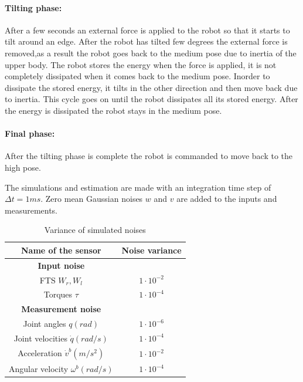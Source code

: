 \paragraph{Tilting phase:} After a few seconds an external force is applied to the robot so that it starts to tilt around an edge. After the robot has tilted few degrees the external force is removed,as a result the robot goes back to the medium pose due to inertia of the upper body. The robot stores the energy when the force is applied, it is not completely dissipated when it comes back to the medium pose. Inorder to dissipate the stored energy, it tilts in the other direction and then move back due to inertia. This cycle goes on until the robot dissipates all its stored energy. After the energy is dissipated the robot stays in the medium pose.
\paragraph{Final phase:} After the tilting phase is complete the robot is commanded to move back to the high pose.

The simulations and estimation are made with an integration time step of $\Delta t=1ms$. Zero mean Gaussian noises $w$ and $v$ are added to the inputs and measurements.
\begin{table}[H]
    \centering
    \begin{tabular}{|c|c|}
    \hline
    Name of the sensor &Noise variance \\ \hline
    \textbf{Input noise} &\hspace{2mm}\\
    FTS $W_r,W_l$ & $1 \cdot {10}^{-2}$ \\ 
    Torques $\tau$ & $1 \cdot {10}^{-4}$\\    \hline
    \textbf{Measurement noise} &\hspace{2mm}\\
    Joint angles $q(rad)$ &$1\cdot{10}^{-6}$ \\ 
    Joint velocities $\dot q(rad/s)$ &$1\cdot{10}^{-4}$ \\
    Acceleration $\dot v^b(m/s^2)$ &$1\cdot{10}^{-2}$ \\ 
    Angular velocity $\omega^b(rad/s)$ &$1\cdot{10}^{-4}$ \\ \hline
    \end{tabular}
    \caption{Variance of simulated noises}
    \label{tab:toro_var}
\end{table}

